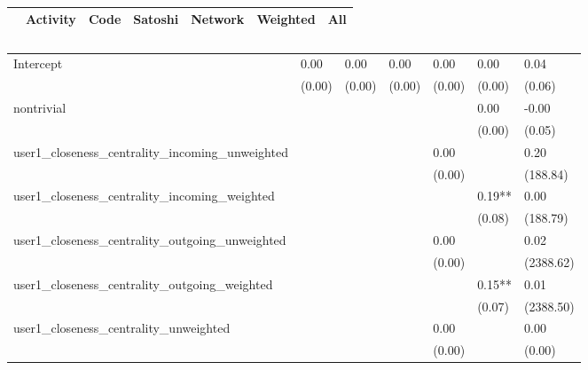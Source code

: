 \begin{table}
\caption{}
\begin{center}
\begin{tabular}{lcccccc}
\hline
                                               & Activity &   Code  & Satoshi & Network & Weighted &    All     \\
\hline
\hline
\end{tabular}
\begin{tabular}{lllllll}
Intercept                                      & 0.00     & 0.00    & 0.00    & 0.00    & 0.00     & 0.04       \\
                                               & (0.00)   & (0.00)  & (0.00)  & (0.00)  & (0.00)   & (0.06)     \\
nontrivial                                     &          &         &         &         & 0.00     & -0.00      \\
                                               &          &         &         &         & (0.00)   & (0.05)     \\
user1_closeness_centrality_incoming_unweighted &          &         &         & 0.00    &          & 0.20       \\
                                               &          &         &         & (0.00)  &          & (188.84)   \\
user1_closeness_centrality_incoming_weighted   &          &         &         &         & 0.19**   & 0.00       \\
                                               &          &         &         &         & (0.08)   & (188.79)   \\
user1_closeness_centrality_outgoing_unweighted &          &         &         & 0.00    &          & 0.02       \\
                                               &          &         &         & (0.00)  &          & (2388.62)  \\
user1_closeness_centrality_outgoing_weighted   &          &         &         &         & 0.15**   & 0.01       \\
                                               &          &         &         &         & (0.07)   & (2388.50)  \\
user1_closeness_centrality_unweighted          &          &         &         & 0.00    &          & 0.00       \\
                                               &          &         &         & (0.00)  &          & (0.00)     \\

\end{tabular}
\end{center}
\end{table}
